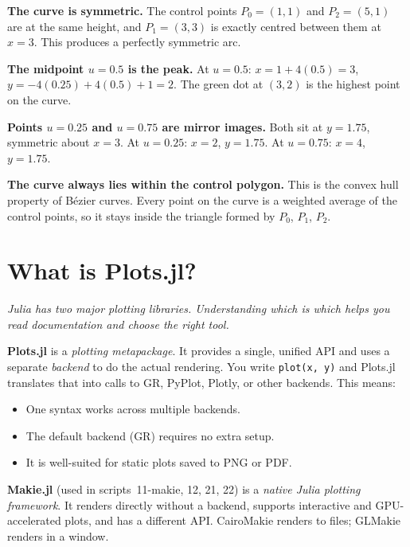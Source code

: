 \documentclass[12pt, a4paper]{article}
\newcommand{\cd}[1]{\texttt{#1}}
\begin{document}
\begin{examplebox}
\textbf{The curve is symmetric.}
The control points $P_0 = (1,1)$ and $P_2 = (5,1)$
are at the same height, and $P_1 = (3,3)$ is exactly
centred between them at $x = 3$.
This produces a perfectly symmetric arc.

\textbf{The midpoint $u = 0.5$ is the peak.}
At $u = 0.5$: $x = 1 + 4(0.5) = 3$, $y = -4(0.25) + 4(0.5) + 1 = 2$.
The green dot at $(3, 2)$ is the highest point on the curve.

\textbf{Points $u = 0.25$ and $u = 0.75$ are mirror images.}
Both sit at $y = 1.75$, symmetric about $x = 3$.
At $u = 0.25$: $x = 2$, $y = 1.75$.
At $u = 0.75$: $x = 4$, $y = 1.75$.

\textbf{The curve always lies within the control polygon.}
This is the convex hull property of B\'ezier curves.
Every point on the curve is a weighted average of the
control points, so it stays inside the triangle
formed by $P_0$, $P_1$, $P_2$.
\end{examplebox}


\section{What is Plots.jl?}

\textit{Julia has two major plotting libraries.
Understanding which is which helps you read documentation
and choose the right tool.}

\textbf{Plots.jl} is a \emph{plotting metapackage}.
It provides a single, unified API and uses a separate
\emph{backend} to do the actual rendering.
You write \cd{plot(x, y)} and Plots.jl translates that
into calls to GR, PyPlot, Plotly, or other backends.
This means:
\begin{itemize}
  \item One syntax works across multiple backends.
  \item The default backend (GR) requires no extra setup.
  \item It is well-suited for static plots saved to PNG or PDF.
\end{itemize}

\textbf{Makie.jl} (used in scripts~11-makie, 12, 21, 22) is a
\emph{native Julia plotting framework}.
It renders directly without a backend, supports interactive
and GPU-accelerated plots, and has a different API.
CairoMakie renders to files; GLMakie renders in a window.
\end{document}
